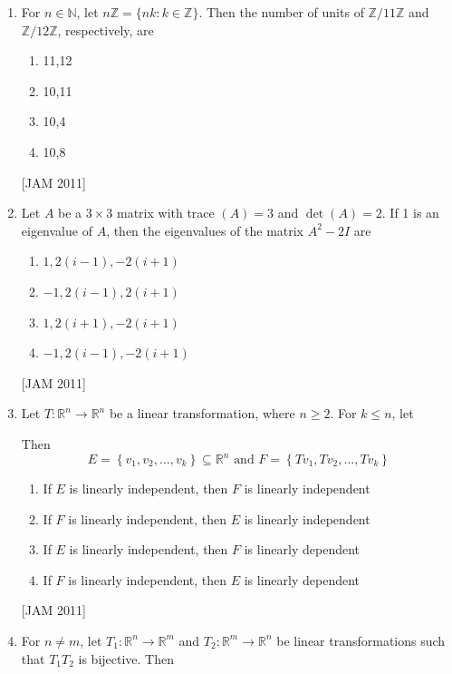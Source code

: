\begin{enumerate}
 


\item  For $n \in \mathbb{N}$, let $n \mathbb{Z}=\{n k: k \in \mathbb{Z}\}$. Then the number of units of $\mathbb{Z} / 11 \mathbb{Z}$ and $\mathbb{Z} / 12 \mathbb{Z}$, respectively, are 
\begin{enumerate}
    \item 11,12 
\item 10,11 
\item 10,4 
\item 10,8
\end{enumerate}
\hfill [JAM 2011]




\item  Let $A$ be a $3 \times 3$ matrix with trace $(A)=3$ and $\operatorname{det}(A)=2$. If 1 is an eigenvalue of $A$, then the eigenvalues of the matrix $A^{2}-2 I$ are 
\begin{enumerate}
    \item $1,2(i-1),-2(i+1)$ 
\item $-1,2(i-1), 2(i+1)$ 
\item $1,2(i+1),-2(i+1)$ 
\item $-1,2(i-1),-2(i+1)$

\end{enumerate}
\hfill [JAM 2011]



\item  Let $T: \mathbb{R}^{n} \rightarrow \mathbb{R}^{n}$ be a linear transformation, where $n \geq 2$. For $k \leq n$, let

Then
$$
E=\left\{v_{1}, v_{2}, \ldots, v_{k}\right\} \subseteq \mathbb{R}^{n} \text { and } F=\left\{T v_{1}, T v_{2}, \ldots, T v_{k}\right\}
$$
\begin{enumerate}
    \item If $E$ is linearly independent, then $F$ is linearly independent 
\item If $F$ is linearly independent, then $E$ is linearly independent 
\item If $E$ is linearly independent, then $F$ is linearly dependent 
\item If $F$ is linearly independent, then $E$ is linearly dependent

\end{enumerate}
\hfill [JAM 2011]



\item  For $n \neq m$, let $T_{1}: \mathbb{R}^{n} \rightarrow \mathbb{R}^{m}$ and $T_{2}: \mathbb{R}^{m} \rightarrow \mathbb{R}^{n}$ be linear transformations such that $T_{1} T_{2}$ is bijective. Then
\begin{enumerate}
     

\end{enumerate}
\end{enumerate}
